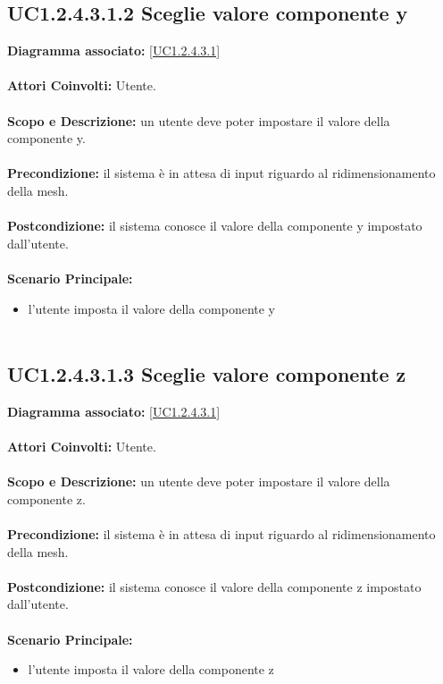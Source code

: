 \subsection{UC1.2.4.3.1.2 Sceglie valore componente y}
\textbf{Diagramma associato:}
\ref{UC1.2.4.3.1} \\ \\
\textbf{Attori Coinvolti:}
Utente. \\ \\
\textbf{Scopo e Descrizione:}
un utente deve poter impostare il valore della componente y. \\ \\
\textbf{Precondizione:}
il sistema è in attesa di input riguardo al ridimensionamento della mesh. \\ \\
\textbf{Postcondizione:}
il sistema conosce il valore della componente y impostato dall'utente. \\ \\
\textbf{Scenario Principale:}
\begin{itemize}
\item l'utente imposta il valore della componente y
\\ \\ \end{itemize}


\subsection{UC1.2.4.3.1.3 Sceglie valore componente z}
\textbf{Diagramma associato:}
\ref{UC1.2.4.3.1} \\ \\
\textbf{Attori Coinvolti:}
Utente. \\ \\
\textbf{Scopo e Descrizione:}
un utente deve poter impostare il valore della componente z. \\ \\
\textbf{Precondizione:}
il sistema è in attesa di input riguardo al ridimensionamento della mesh. \\ \\
\textbf{Postcondizione:}
il sistema conosce il valore della componente z impostato dall'utente. \\ \\
\textbf{Scenario Principale:}
\begin{itemize}
\item l'utente imposta il valore della componente z
\\ \\ \end{itemize}


